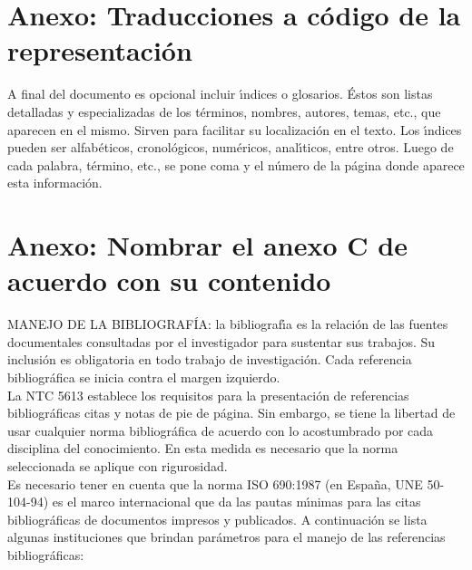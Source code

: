 \begin{appendix}
\chapter{Anexo: Traducciones a código de la representación}
A final del documento es opcional incluir \'{\i}ndices o glosarios. \'{E}stos son listas detalladas y especializadas de los t\'{e}rminos, nombres, autores, temas, etc., que aparecen en el mismo. Sirven para facilitar su localizaci\'{o}n en el texto. Los \'{\i}ndices pueden ser alfab\'{e}ticos, cronol\'{o}gicos, num\'{e}ricos, anal\'{\i}ticos, entre otros. Luego de cada palabra, t\'{e}rmino, etc., se pone coma y el n\'{u}mero de la p\'{a}gina donde aparece esta informaci\'{o}n.\\

\chapter{Anexo: Nombrar el anexo C de acuerdo con su contenido}
MANEJO DE LA BIBLIOGRAF\'{I}A: la bibliograf\'{\i}a es la relaci\'{o}n de las fuentes documentales consultadas por el investigador para sustentar sus trabajos. Su inclusi\'{o}n es obligatoria en todo trabajo de investigaci\'{o}n. Cada referencia bibliogr\'{a}fica se inicia contra el margen izquierdo.\\

La NTC 5613 establece los requisitos para la presentaci\'{o}n de referencias bibliogr\'{a}ficas citas y notas de pie de p\'{a}gina. Sin embargo, se tiene la libertad de usar cualquier norma bibliogr\'{a}fica de acuerdo con lo acostumbrado por cada disciplina del conocimiento. En esta medida es necesario que la norma seleccionada se aplique con rigurosidad.\\

Es necesario tener en cuenta que la norma ISO 690:1987 (en Espa\~{n}a, UNE 50-104-94) es el marco internacional que da las pautas m\'{\i}nimas para las citas bibliogr\'{a}ficas de documentos impresos y publicados. A continuaci\'{o}n se lista algunas instituciones que brindan par\'{a}metros para el manejo de las referencias bibliogr\'{a}ficas:\\


\end{appendix}
